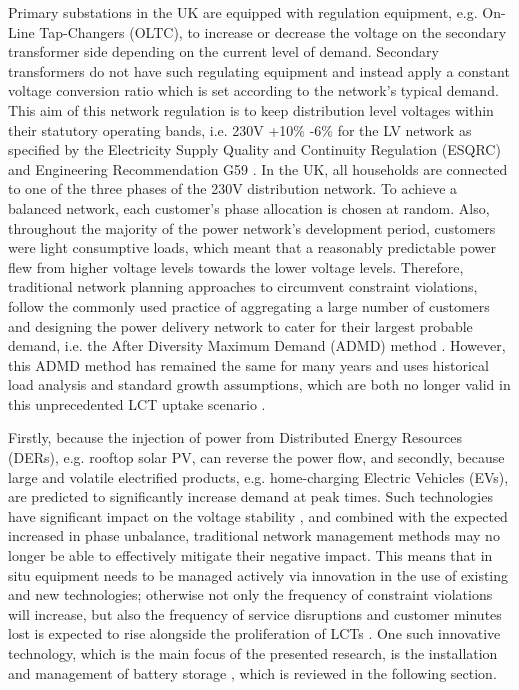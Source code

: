 Primary substations in the UK are equipped with regulation equipment, e.g. On-Line Tap-Changers (OLTC), to increase or decrease the voltage on the secondary transformer side depending on the current level of demand.
Secondary transformers do not have such regulating equipment and instead apply a constant voltage conversion ratio which is set according to the network's typical demand.
This aim of this network regulation is to keep distribution level voltages within their statutory operating bands, i.e. 230V +10\% -6\% for the LV network as specified by the Electricity Supply Quality and Continuity Regulation (ESQRC) \cite{HealthandSafetyExecutive2002} and Engineering Recommendation G59 \cite{EnergyNetworksAssociation2013}.
In the UK, all households are connected to one of the three phases of the 230V distribution network.
To achieve a balanced network, each customer's phase allocation is chosen at random.
Also, throughout the majority of the power network's development period, customers were light consumptive loads, which meant that a reasonably predictable power flew from higher voltage levels towards the lower voltage levels.
Therefore, traditional network planning approaches to circumvent constraint violations, follow the commonly used practice of aggregating a large number of customers and designing the power delivery network to cater for their largest probable demand, i.e. the After Diversity Maximum Demand (ADMD) method \cite{Richardson2010a}.
However, this ADMD method has remained the same for many years and uses historical load analysis and standard growth assumptions, which are both no longer valid in this unprecedented LCT uptake scenario \cite{Yunusov2016}.

Firstly, because the injection of power from Distributed Energy Resources (DERs), e.g. rooftop solar PV, can reverse the power flow, and secondly, because large and volatile electrified products, e.g. home-charging Electric Vehicles (EVs), are predicted to significantly increase demand at peak times.
Such technologies have significant impact on the voltage stability \cite{Petinrin2016}, and combined with the expected increased in phase unbalance, traditional network management methods may no longer be able to effectively mitigate their negative impact.
This means that in situ equipment needs to be managed actively via innovation in the use of existing and new technologies; otherwise not only the frequency of constraint violations will increase, but also the frequency of service disruptions and customer minutes lost is expected to rise alongside the proliferation of LCTs \cite{Ault2008a}.
One such innovative technology, which is the main focus of the presented research, is the installation and management of battery storage \cite{Chen2009}, which is reviewed in the following section.















